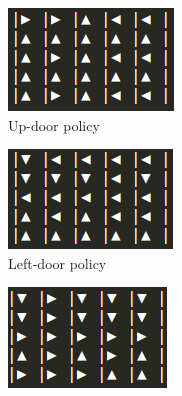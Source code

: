 \documentclass[]{article}
\begin{document}
\begin{figure}
	\centering
	\begin{subfigure}[b]{0.475\textwidth}
		\centering
		\includegraphics[width=.9\linewidth]{up_policy.png}
		\caption{Up-door policy}
	\end{subfigure}
	\begin{subfigure}[b]{0.475\textwidth}
		\centering
		\includegraphics[width=.9\linewidth]{left_policy.png}
		\caption{Left-door policy}
	\end{subfigure}
	\begin{subfigure}[b]{0.475\textwidth}
		\centering
		\includegraphics[width=.9\linewidth]{right_policy.png}

\end{subfigure}
\end{figure}
\end{document}

